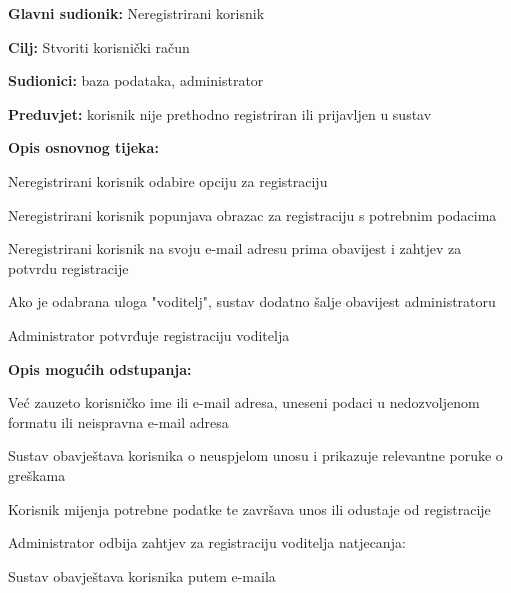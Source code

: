 					\noindent {}
					\begin{packed_item}
						
						\item \textbf{Glavni sudionik: }Neregistrirani korisnik
						\item  \textbf{Cilj:} Stvoriti korisnički račun
						\item  \textbf{Sudionici:} baza podataka, administrator 
						\item  \textbf{Preduvjet:} korisnik nije prethodno registriran ili prijavljen u sustav
						\item  \textbf{Opis osnovnog tijeka:}
						
						\item[] \begin{packed_enum}
							
							\item Neregistrirani korisnik odabire opciju za registraciju 
							\item Neregistrirani korisnik popunjava obrazac za registraciju s potrebnim podacima 
							\item Neregistrirani korisnik na svoju e-mail adresu prima obavijest i zahtjev za potvrdu registracije
							\item Ako je odabrana uloga "voditelj", sustav dodatno šalje obavijest administratoru 
							\item Administrator potvrđuje registraciju voditelja 
						\end{packed_enum}
						
						\item  \textbf{Opis mogućih odstupanja:}
						\item[] \begin{packed_item}
							
							\item[2.a] Već zauzeto korisničko ime ili e-mail adresa, uneseni podaci u nedozvoljenom formatu ili neispravna e-mail adresa 
							\item[] \begin{packed_enum}
								
								\item Sustav obavještava korisnika o neuspjelom unosu i prikazuje relevantne poruke o greškama 
								\item Korisnik mijenja potrebne podatke te završava unos ili odustaje od registracije 
								
							\end{packed_enum}
							
							\item[5.a] Administrator odbija zahtjev za registraciju voditelja natjecanja:
							\item[] \begin{packed_enum}
								
								\item Sustav obavještava korisnika putem e-maila
								
							\end{packed_enum}
						\end{packed_item}
					\end{packed_item}
					
